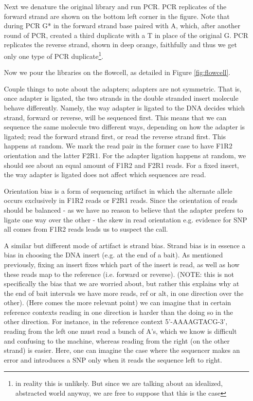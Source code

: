 \documentclass[a4paper]{article}
\begin{document}
Next we denature the original library and run PCR. PCR replicates of the forward strand are shown on the bottom left corner in the figure. Note that during PCR G* in the forward strand base paired with A, which, after another round of PCR, created a third duplicate with a T in place of the original G. PCR replicates the reverse strand, shown in deep orange, faithfully and thus we get only one type of PCR duplicate\footnote{in reality this is unlikely. But since we are talking about an idealized, abstracted world anyway, we are free to suppose that this is the case}. 

Now we pour the libraries on the flowcell, as detailed in Figure \ref{fig:flowcell}. 


 

Couple things to note about the adapters; adapters are not symmetric. That is, once adapter is ligated, the two strands in the double stranded insert molecule behave differently. Namely, the way adapter is ligated to the DNA decides which strand, forward or reverse, will be sequenced first. This means that we can sequence the same molecule two different ways, depending on how the adapter is ligated; read the forward strand first, or read the reverse strand first. This happens at random. We mark the read pair in the former case to have F1R2 orientation and the latter F2R1. For the adapter ligation happens at random, we should see about an equal amount of F1R2 and F2R1 reads. For a fixed insert, the way adapter is ligated does not affect which sequences are read. 

Orientation bias is a form of sequencing artifact in which the alternate allele occurs exclusively in F1R2 reads or F2R1 reads. Since the orientation of reads should be balanced - as we have no reason to believe that the adapter prefers to ligate one way over the other - the skew in read orientation e.g. evidence for SNP all comes from F1R2 reads leads us to suspect the call.

A similar but different mode of artifact is strand bias. Strand bias is in essence a bias in choosing the DNA insert (e.g. at the end of a bait). As mentioned previously, fixing an insert fixes which part of the insert is read, as well as how these reads map to the reference (i.e. forward or reverse). (NOTE: this is not specifically the bias that we are worried about, but rather this explains why at the end of bait intervals we have more reads, ref or alt, in one direction over the other). (Here comes the more relevant point) we can imagine that in certain reference contexts reading in one direction is harder than the doing so in the other direction. For instance, in the reference context 5'-AAAAGTACG-3', reading from the left one must read a bunch of A's, which we know is difficult and confusing to the machine, whereas reading from the right (on the other strand) is easier. Here, one can imagine the case where the sequencer makes an error and introduces a SNP only when it reads the sequence left to right. 
\end{document}
